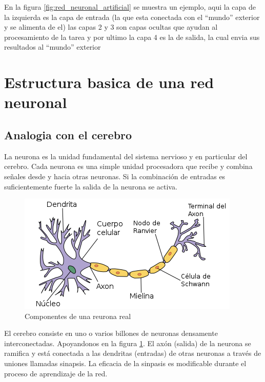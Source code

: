 \documentclass[runningheads]{llncs} %
\begin{document}
En la figura \ref{fig:red_neuronal_artificial} se muestra un ejemplo,
aqui la capa de la izquierda es la capa de entrada (la que esta
conectada con el \textquotedblleft{mundo}\textquotedblright{} exterior y se alimenta de el)
las capas 2 y 3 son capas ocultas que ayudan al procesamiento
de la tarea y por ultimo la capa 4 es la de salida, la cual
envia sus resultados al \textquotedblleft{mundo}\textquotedblright{} exterior

\section{Estructura basica de una red neuronal}
\subsection{Analogia con el cerebro}
La neurona es la unidad fundamental del sistema nervioso y en particular 
del cerebro. Cada neurona es una simple unidad procesadora que recibe y combina 
señales desde y hacia otras neuronas. 
Si la combinación de entradas es suficientemente fuerte la salida de la neurona
se activa. \cite{libro-def}

\begin{figure}
    \centering
    \includegraphics[scale=0.7]{neurona_real.png}
    \caption{Componentes de una reurona real \cite{img-neurona_real}}
    \label{fig:neurona_real}
\end{figure}

El cerebro consiste en uno o varios billones de neuronas densamente 
interconectadas. Apoyandonos en la figura \ref{fig:neurona_real}.
El axón (salida) de la neurona se ramifica y está conectada a las dendritas (entradas) 
de otras neuronas a través de uniones llamadas sinapsis.
La eficacia de la sinpasis es modificable durante el proceso de 
aprendizaje de la red. \cite{libro-def}
\end{document}

